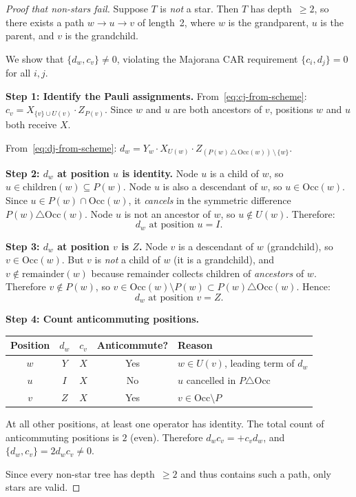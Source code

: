 \begin{proof}[Proof that non-stars fail]
Suppose $T$ is \emph{not} a star.  Then $T$ has depth~$\ge 2$, so
there exists a path $w \to u \to v$ of length~2, where $w$ is the
grandparent, $u$ is the parent, and $v$ is the grandchild.

We show that $\{d_w, c_v\} \neq 0$, violating the Majorana CAR
requirement $\{c_i, d_j\} = 0$ for all $i, j$.

\textbf{Step 1: Identify the Pauli assignments.}
From~\eqref{eq:cj-from-scheme}: $c_v = X_{\{v\} \cup U(v)} \cdot
Z_{P(v)}$.  Since $w$ and $u$ are both ancestors of $v$, positions
$w$ and $u$ both receive $X$.

From~\eqref{eq:dj-from-scheme}: $d_w = Y_w \cdot X_{U(w)} \cdot
Z_{(P(w)\,\triangle\,\mathrm{Occ}(w))\,\setminus\,\{w\}}$.

\textbf{Step 2: $d_w$ at position $u$ is identity.}
Node $u$ is a child of $w$, so $u \in \text{children}(w) \subseteq
P(w)$.  Node $u$ is also a descendant of $w$, so $u \in \mathrm{Occ}(w)$.
Since $u \in P(w) \cap \mathrm{Occ}(w)$, it \emph{cancels} in the
symmetric difference $P(w) \triangle \mathrm{Occ}(w)$.  Node $u$ is
not an ancestor of $w$, so $u \notin U(w)$.  Therefore:
\[
  d_w \text{ at position } u = I.
\]

\textbf{Step 3: $d_w$ at position $v$ is $Z$.}
Node $v$ is a descendant of $w$ (grandchild), so
$v \in \mathrm{Occ}(w)$.  But $v$ is \emph{not} a child of $w$
(it is a grandchild), and $v \notin \text{remainder}(w)$ because
remainder collects children of \emph{ancestors} of $w$.  Therefore
$v \notin P(w)$, so $v \in \mathrm{Occ}(w) \setminus P(w) \subset
P(w) \triangle \mathrm{Occ}(w)$.  Hence:
\[
  d_w \text{ at position } v = Z.
\]

\textbf{Step 4: Count anticommuting positions.}
\begin{center}
\begin{tabular}{@{}ccccl@{}}
\toprule
Position & $d_w$ & $c_v$ & Anticommute? & Reason \\
\midrule
$w$ & $Y$ & $X$ & Yes & $w \in U(v)$, leading term of $d_w$ \\
$u$ & $I$ & $X$ & No  & $u$ cancelled in $P \triangle \mathrm{Occ}$ \\
$v$ & $Z$ & $X$ & Yes & $v \in \mathrm{Occ} \setminus P$ \\
\bottomrule
\end{tabular}
\end{center}

At all other positions, at least one operator has identity.  The total
count of anticommuting positions is $2$ (even).  Therefore
$d_w c_v = +c_v d_w$, and $\{d_w, c_v\} = 2 d_w c_v \neq 0$.

Since every non-star tree has depth~$\ge 2$ and thus contains such a
path, only stars are valid.
\end{proof}

